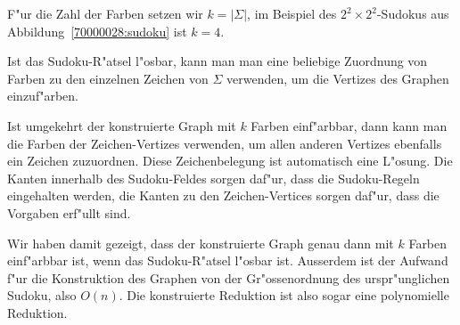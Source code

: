 \begin{loesung}
F"ur die Zahl der Farben setzen wir $k=|\Sigma|$, im Beispiel des
$2^2\times 2^2$-Sudokus aus Abbildung~\ref{70000028:sudoku} ist $k=4$.

Ist das Sudoku-R"atsel l"osbar, kann man man eine beliebige
Zuordnung von Farben zu den einzelnen Zeichen von $\Sigma$ verwenden,
um die Vertizes des Graphen einzuf"arben. 

Ist umgekehrt der konstruierte Graph mit $k$ Farben einf"arbbar, dann kann man
die Farben der Zeichen-Vertizes verwenden, um allen anderen Vertizes
ebenfalls ein Zeichen zuzuordnen. Diese Zeichenbelegung ist automatisch
eine L"osung. Die Kanten innerhalb des Sudoku-Feldes sorgen daf"ur, dass
die Sudoku-Regeln eingehalten werden, die Kanten zu den Zeichen-Vertices
sorgen daf"ur, dass die Vorgaben erf"ullt sind.

Wir haben damit gezeigt, dass der konstruierte Graph genau dann mit
$k$ Farben einf"arbbar ist, wenn das Sudoku-R"atsel l"osbar ist. 
Ausserdem ist der Aufwand f"ur die Konstruktion des Graphen von der
Gr"ossenordnung des urspr"unglichen Sudoku, also $O(n)$. Die konstruierte
Reduktion ist also sogar eine polynomielle Reduktion.
\end{loesung}


